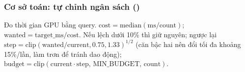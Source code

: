 \subsubsection{Cơ sở toán: tự chỉnh ngân sách (\texorpdfstring{}{SplatRenderer.adapt_budget})}\label{s:budget}
Đo thời gian GPU bằng query. $\mathrm{cost}=\mathrm{median}(\mathrm{ms}/\mathrm{count})$; $\mathrm{wanted}=\mathrm{target\_ms}/\mathrm{cost}$. Nếu lệch dưới 10\% thì giữ nguyên; ngược lại $\mathrm{step}=\mathrm{clip}(\mathrm{wanted}/\mathrm{current},0.75,1.33)^{1/2}$ (căn bậc hai nên đổi tối đa khoảng 15\%/lần, làm trơn để tránh dao động); $\mathrm{budget}=\mathrm{clip}(\mathrm{current}\cdot\mathrm{step},\,\mathrm{MIN\_BUDGET},\,\mathrm{count})$.
